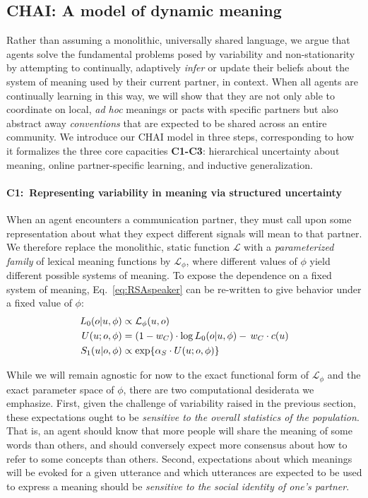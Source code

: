 \subsection{CHAI: A model of dynamic meaning}

Rather than assuming a monolithic, universally shared language, we argue that agents solve the fundamental problems posed by variability and non-stationarity by attempting to continually, adaptively \emph{infer} or update their beliefs about the system of meaning used by their current partner, in context.
When all agents are continually learning in this way, we will show that they are not only able to coordinate on local, \emph{ad hoc} meanings or pacts with specific partners but also abstract away \emph{conventions} that are expected to be shared across an entire community.
We introduce our CHAI model in three steps, corresponding to how it formalizes the three core capacities \textbf{C1-C3}: hierarchical uncertainty about meaning, online partner-specific learning, and inductive generalization.

\paragraph{C1:~Representing variability in meaning via structured uncertainty} 

When an agent encounters a communication partner, they must call upon some representation about what they expect different signals will mean to that partner. 
We therefore replace the monolithic, static function $\mathcal{L}$ with a \emph{parameterized family} of lexical meaning functions by $\mathcal{L}_{\phi}$, where different values of $\phi$ yield different possible systems of meaning. 
To expose the dependence on a fixed system of meaning, Eq.~\ref{eq:RSAspeaker} can be re-written to give behavior under a fixed value of $\phi$:
\begin{align}
L_0(o | u, \phi) &\propto  \mathcal{L}_\phi(u,o)\hfill\label{eq:RSA} \\
U(u; o, \phi) & = (1-w_C) \cdot \log L_0(o | u, \phi) -\, w_C \cdot c(u) \nonumber  \\
S_1(u | o,\phi) & \propto   \exp\{\alpha_S \cdot U(u; o, \phi)\} \nonumber 
\end{align}

While we will remain agnostic for now to the exact functional form of $\mathcal{L}_\phi$ and the exact parameter space of $\phi$, there are two computational desiderata we emphasize.
First, given the challenge of variability raised in the previous section, these expectations ought to be \emph{sensitive to the overall statistics of the population}. 
That is, an agent should know that more people will share the meaning of some words than others, and should conversely expect more consensus about how to refer to some concepts than others.
Second, expectations about which meanings will be evoked for a given utterance and which utterances are expected to be used to express a meaning should be \emph{sensitive to the social identity of one's partner}.%

